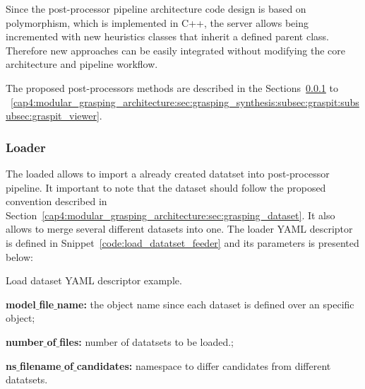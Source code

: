 Since the post-processor pipeline architecture code design is based on polymorphism, which is implemented in C++, the server allows being incremented with new heuristics classes that inherit a defined parent class. Therefore new approaches can be easily integrated without modifying the core architecture and pipeline workflow. 

The proposed post-processors methods are described in the Sections~\ref{cap4:modular_grasping_architecture:sec:grasping_synthesis:subsec:graspit:subsubsec:loader} to ~\ref{cap4:modular_grasping_architecture:sec:grasping_synthesis:subsec:graspit:subsubsec:graspit_viewer}.

\subsubsection{Loader}
\label{cap4:modular_grasping_architecture:sec:grasping_synthesis:subsec:graspit:subsubsec:loader}

The loaded  allows to import a already created datatset into post-processor pipeline. It important to note that the dataset should follow the proposed convention described in Section~\ref{cap4:modular_grasping_architecture:sec:grasping_dataset}. It also allows to merge several different datasets into one. The loader YAML descriptor is defined in Snippet~\ref{code:load_datatset_feeder} and its parameters is presented below:

\begin{snippet}[h!]
\centering
{}
\caption{Load dataset YAML descriptor example.}
\label{code:load_datatset_feeder}
\end{snippet}

\begin{itemize_jp}
    \item \textbf{model$\_$file$\_$name:} the object name since each dataset is defined over an specific object;
    \item \textbf{number$\_$of$\_$files:} number of datatsets to be loaded.;
    \item \textbf{ns$\_$filename$\_$of$\_$candidates:} namespace to differ candidates from different datatsets.
\end{itemize_jp}

